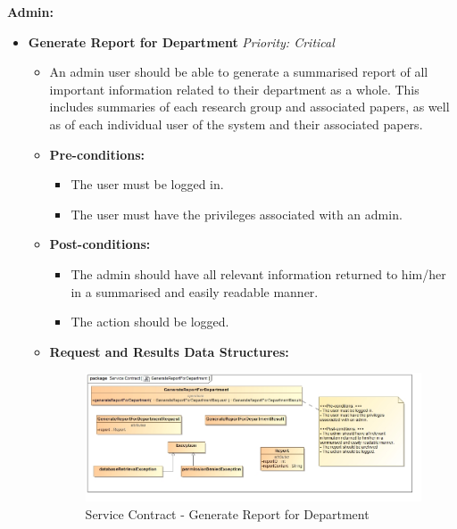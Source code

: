 \documentclass{article}
\begin{document}
				\cleardoublepage
				\textbf{Admin:}
				\begin{itemize}
					\item \textbf{Generate Report for Department} \hfill \textit{Priority: Critical}
					\begin{itemize}
						\item An admin user should be able to generate a summarised report of all important information related to their department as a whole. This includes summaries of each research group and associated papers, as well as of each individual user of the system and their associated papers.
						\item \textbf{Pre-conditions:}
						\begin{itemize}
							\item The user must be logged in.
							\item The user must have the privileges associated with an admin.
						\end{itemize}
						\item \textbf{Post-conditions:}
						\begin{itemize}
							\item The admin should have all relevant information returned to him/her in a summarised and easily readable manner.
							\item The action should be logged.
						\end{itemize}
						\item \textbf{Request and Results Data Structures:}
						\begin{figure}[H]
							\includegraphics[width=\linewidth]{../Diagrams/ServiceContracts/Reporting subsystem/GenerateReportForDepartment.jpg}
							\caption{Service Contract - Generate Report for Department}
						\end{figure}
					\end{itemize}


\end{itemize}
\end{document}
